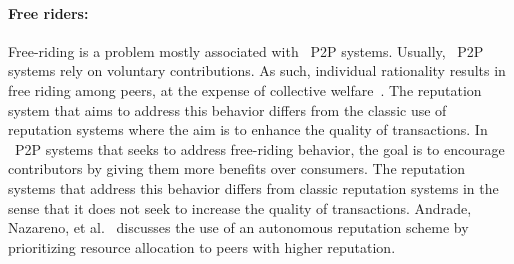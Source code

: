 \paragraph{Free riders:}Free-riding is a problem mostly associated with ~\ac{P2P} systems. Usually, ~\ac{P2P} systems rely on voluntary contributions. As such, individual rationality results in free riding among peers, at the expense of collective welfare~\cite{feldman2006free}. The reputation system that aims to address this behavior differs from the classic use of reputation systems where the aim is to enhance the quality of transactions. In ~\ac{P2P} systems that seeks to address free-riding behavior, the goal is to encourage contributors by giving them more benefits over consumers. The reputation systems that address this behavior differs from classic reputation systems in the sense that it does not seek to increase the quality of transactions. Andrade, Nazareno, et al.~\cite{andrade2004can} discusses the use of an autonomous reputation scheme by prioritizing resource allocation to peers with higher reputation. 

